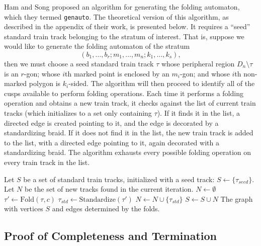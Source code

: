 Ham and Song \cite{HamSong2007} proposed an algorithm for generating the folding automaton, which they termed \texttt{genauto}. The theoretical version of this algorithm, as described in the appendix of their work, is presented below. It requires a ``seed'' standard train track belonging to the stratum of interest. That is, suppose we would like to generate the folding automaton of the stratum
\[
(b_1,\dots,b_r; m_1,\dots, m_n ; k_1,\dots, k_s),
\]
then we must choose a seed standard train track $\tau$ whose peripheral region $D_n \setminus \tau$ is an $r$-gon; whose $i$th marked point is enclosed by an $m_i$-gon; and whose $i$th non-marked polygon is $k_i$-sided. The algorithm will then proceed to identify all of the cusps available to perform folding operations. Each time it performs a folding operation and obtains a new train track, it checks against the list of current train tracks (which initializes to a set only containing $\tau$). If it finds it in the list, a directed edge is created pointing to it, and the edge is decorated by a standardizing braid. If it does not find it in the list, the new train track is added to the list, with a directed edge pointing to it, again decorated with a standardizing braid. The algorithm exhausts every possible folding operation on every train track in the list.

\begin{algorithm}[H]
\caption{genauto (Theoretical \cite{HamSong2007})}
\label{alg:genauto_theoretical}
\begin{algorithmic}[1]
\State Let $S$ be a set of standard train tracks, initialized with a seed track: $S \gets \{ \tau_{seed} \}$.
\State Let $N$ be the set of new tracks found in the current iteration.
\Repeat
    \State $N \gets \emptyset$
            \State $\tau' \gets \text{Fold}(\tau, c)$
            \State $\tau_{std} \gets \text{Standardize}(\tau')$
                \State $N \gets N \cup \{ \tau_{std} \}$
            \EndIf
        \EndFor
    \EndFor
    \State $S \gets S \cup N$
\State \Return The graph with vertices $S$ and edges determined by the folds.
\end{algorithmic}
\end{algorithm}

\subsection{Proof of Completeness and Termination}
\label{sec:autofolder_proof}

